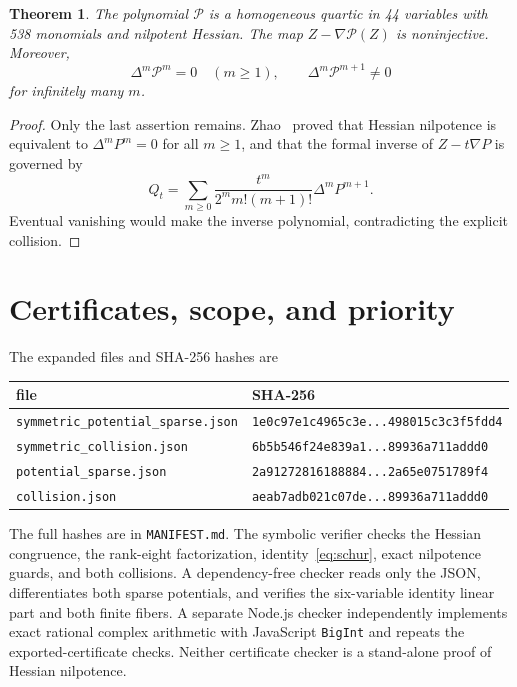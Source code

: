 \documentclass[11pt]{article}
\newtheorem{theorem}{Theorem}
\newcommand{\cP}{\mathcal P}
\begin{document}
\begin{theorem}
The polynomial $\cP$ is a homogeneous quartic in 44 variables with 538
monomials and nilpotent Hessian. The map $Z-\nabla\cP(Z)$ is noninjective.
Moreover,
\begin{equation}
\Delta^m\cP^m=0\quad(m\ge1),\qquad
\Delta^m\cP^{m+1}\ne0
\end{equation}
for infinitely many $m$.
\end{theorem}

\begin{proof}
Only the last assertion remains. Zhao~\cite{zhao} proved that Hessian
nilpotence is equivalent to $\Delta^mP^m=0$ for all $m\ge1$, and that the
formal inverse of $Z-t\nabla P$ is governed by
\begin{equation}
Q_t=\sum_{m\ge0}\frac{t^m}{2^m m!(m+1)!}\Delta^mP^{m+1}.
\end{equation}
Eventual vanishing would make the inverse polynomial, contradicting the
explicit collision.
\end{proof}

\section{Certificates, scope, and priority}

The expanded files and SHA-256 hashes are
\begin{center}\small
\begin{tabular}{@{}ll@{}}
\toprule
file & SHA-256\\
\midrule
\texttt{symmetric\_potential\_sparse.json} &
\texttt{1e0c97e1c4965c3e...498015c3c3f5fdd4}\\
\texttt{symmetric\_collision.json} &
\texttt{6b5b546f24e839a1...89936a711addd0}\\
\texttt{potential\_sparse.json} &
\texttt{2a91272816188884...2a65e0751789f4}\\
\texttt{collision.json} &
\texttt{aeab7adb021c07de...89936a711addd0}\\
\bottomrule
\end{tabular}
\end{center}
The full hashes are in \texttt{MANIFEST.md}. The symbolic verifier checks the
Hessian congruence, the rank-eight factorization, identity~\eqref{eq:schur},
exact nilpotence guards, and both collisions. A dependency-free checker reads
only the JSON, differentiates both sparse potentials, and verifies the
six-variable identity linear part and both finite fibers. A separate Node.js
checker independently implements exact rational complex arithmetic with
JavaScript \texttt{BigInt} and repeats the exported-certificate checks. Neither
certificate checker is a stand-alone proof of Hessian nilpotence.
\end{document}
